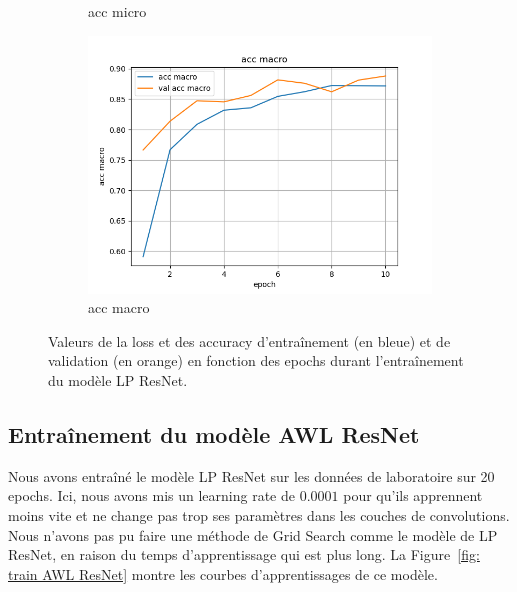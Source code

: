 \documentclass[a4paper]{article}
\begin{document}
\begin{figure}[ht]
\begin{subfigure}{0.32\textwidth}
        \caption{acc micro}
    \end{subfigure}
    \begin{subfigure}{0.32\textwidth}
        \centering
        \includegraphics[width=\linewidth]{../logs/resnet_img256_0/acc macro.png}
        \caption{acc macro}
    \end{subfigure}
    \caption{Valeurs de la loss et des accuracy d'entraînement (en bleue) et de validation (en orange) en fonction des epochs durant l'entraînement du modèle LP ResNet.}
    \label{fig: train LP ResNet}
\end{figure}

\subsection{Entraînement du modèle AWL ResNet}
Nous avons entraîné le modèle LP ResNet sur les données de laboratoire sur 20 epochs. Ici, nous avons mis un learning rate de $0.0001$ pour qu'ils apprennent moins vite et ne change pas trop ses paramètres dans les couches de convolutions. Nous n'avons pas pu faire une méthode de Grid Search comme le modèle de LP ResNet, en raison du temps d'apprentissage qui est plus long. La Figure~\ref{fig: train AWL ResNet} montre les courbes d'apprentissages de ce modèle.
\end{document}
